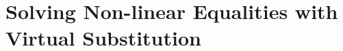 \section{Solving Non-linear Equalities with Virtual Substitution}
\label{sec:solving non-linear equalities with virtual substitution}

